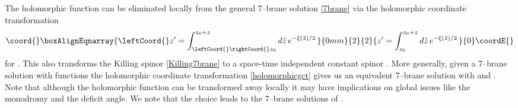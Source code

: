 \documentclass[12pt,a4paper]{article}
\begin{document}
The holomorphic function \coordHE{} can be eliminated locally from the
general 7--brane solution \eqref{7brane} via the holomorphic coordinate
transformation
\begin{align}\coord{}\boxAlignEqnarray{
  \leftCoord{}z' = \int_{\leftCoord{}\rightCoord{}z_0}^{z_0+z} d \tilde{z} \, e^{-\xi(\tilde{z})/2 }\,
\label{holomorphicgct}
}{0mm}{2}{2}{
  z' = \int_{z_0}^{z_0+z} d \tilde{z} \, e^{-\xi(\tilde{z})/2 }\,
}{0}\coordE{}\end{align}
for \coordHE{}.
This also transforms the Killing spinor \eqref{Killing7brane}
to a space-time independent constant spinor \coordHE{}.
More generally, given a 7--brane solution
with functions \coordHE{} the holomorphic coordinate transformation
\eqref{holomorphicgct} gives us an equivalent 7--brane solution with
\coordHE{} and \coordHE{}.
Note that although the holomorphic function \coordHE{} can be transformed away
locally it may have implications on global issues like the monodromy
and the deficit angle. We note that the choice \coordHE{}
leads to the 7--brane solutions of \cite{Einhorn:2000ct}.
\end{document}
